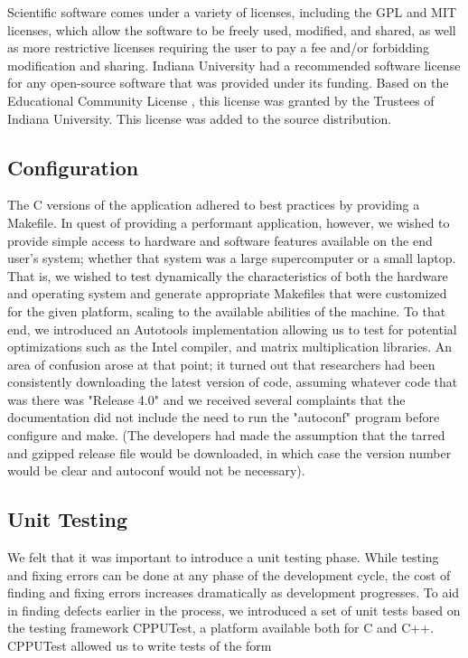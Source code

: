\documentclass[acmtog, authorversion]{acmart}
\begin{document}
Scientific software comes under a variety of licenses, including the GPL and MIT licenses, which allow the software to be freely used, modified, and shared, as well as more restrictive licenses requiring the user to pay a fee and/or forbidding modification and sharing. Indiana University had a recommended software license for any open-source software that was provided under its funding. Based on the Educational Community License \cite{EduLicense}, this license was granted by the Trustees of Indiana University. This license was added to the source distribution.

\subsection{Configuration}
The C versions of the application adhered to best practices by providing a Makefile. In quest of providing a performant application, however, we wished to provide simple access to hardware and software features available on the end user's system; whether that system was a large supercomputer or a small laptop. That is, we wished to test dynamically the characteristics of both the hardware and operating system and generate appropriate Makefiles that were customized for the given platform, scaling to the available abilities of the machine. To that end, we introduced an Autotools \cite{Hagen2006} implementation allowing us to test for potential optimizations such as the Intel compiler, and matrix multiplication libraries. An area of confusion arose at that point; it turned out that researchers had been consistently downloading the latest version of code, assuming whatever code that was there was "Release 4.0" and we received several complaints that the documentation did not include the need to run the "autoconf" program before configure and make. (The developers had made the assumption that the tarred and gzipped release file would be downloaded, in which case the version number would be clear and autoconf would not be necessary).



\subsection{Unit Testing}
    We felt that it was important to introduce a unit testing phase. While testing 
    and fixing errors can be done at any phase of the development cycle, the cost of finding and fixing errors increases dramatically as development progresses.
    To aid in finding defects earlier in the process, we introduced a set of unit tests based on the testing framework CPPUTest, a platform available both
    for C and C++.  CPPUTest allowed us to write tests of the form
\end{document}
